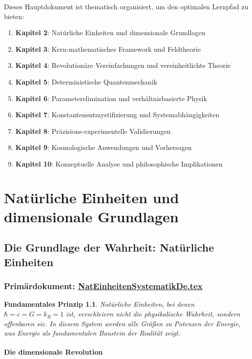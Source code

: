 \documentclass[12pt,a4paper]{report}
\newtheorem{principle}{Fundamentales Prinzip}[chapter]
\begin{document}
	Dieses Hauptdokument ist thematisch organisiert, um den optimalen Lernpfad zu bieten:
	
	\begin{enumerate}
		\item \textbf{Kapitel 2}: Natürliche Einheiten und dimensionale Grundlagen
		\item \textbf{Kapitel 3}: Kern-mathematisches Framework und Feldtheorie
		\item \textbf{Kapitel 4}: Revolutionäre Vereinfachungen und vereinheitlichte Theorie
		\item \textbf{Kapitel 5}: Deterministische Quantenmechanik
		\item \textbf{Kapitel 6}: Parameterelimination und verhältnisbasierte Physik
		\item \textbf{Kapitel 7}: Konstantenentmystifizierung und Systemabhängigkeiten
		\item \textbf{Kapitel 8}: Präzisions-experimentelle Validierungen
		\item \textbf{Kapitel 9}: Kosmologische Anwendungen und Vorhersagen
		\item \textbf{Kapitel 10}: Konzeptuelle Analyse und philosophische Implikationen
	\end{enumerate}
	
	\chapter{Natürliche Einheiten und dimensionale Grundlagen}
	
	\section{Die Grundlage der Wahrheit: Natürliche Einheiten}
	\subsection{Primärdokument: \href{https://github.com/jpascher/T0-Time-Mass-Duality/tree/main/2/pdf/NatEinheitenSystematikDe.pdf}{NatEinheitenSystematikDe.tex}}
	
	\begin{principle}
		Natürliche Einheiten, bei denen $\hbar = c = G = k_B = 1$ ist, verschleiern nicht die physikalische Wahrheit, sondern offenbaren sie. In diesem System werden alle Größen zu Potenzen der Energie, was Energie als fundamentalen Baustein der Realität zeigt.
	\end{principle}
	
	\subsubsection{Die dimensionale Revolution}
	
\end{document}
